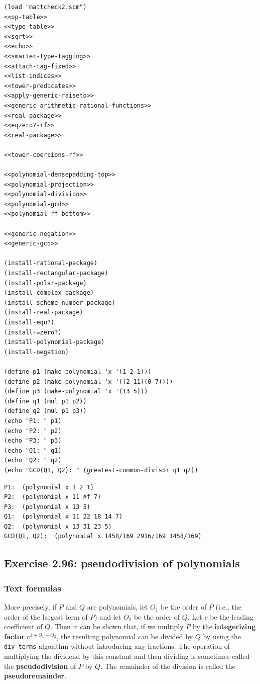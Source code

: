 \documentclass[final,fleqn,titlepage,twoside]{article}
\begin{document}
\begin{verbatim}
(load "mattcheck2.scm")
<<op-table>>
<<type-table>>
<<sqrt>>
<<echo>>
<<smarter-type-tagging>>
<<attach-tag-fixed>>
<<list-indices>>
<<tower-predicates>>
<<apply-generic-raiseto>>
<<generic-arithmetic-rational-functions>>
<<real-package>>
<<eqzero?-rf>>
<<real-package>>

<<tower-coercions-rf>>

<<polynomial-densepadding-top>>
<<polynomial-projection>>
<<polynomial-division>>
<<polynomial-gcd>>
<<polynomial-rf-bottom>>

<<generic-negation>>
<<generic-gcd>>

(install-rational-package)
(install-rectangular-package)
(install-polar-package)
(install-complex-package)
(install-scheme-number-package)
(install-real-package)
(install-equ?)
(install-=zero?)
(install-polynomial-package)
(install-negation)

(define p1 (make-polynomial 'x '(1 2 1)))
(define p2 (make-polynomial 'x '((2 11)(0 7))))
(define p3 (make-polynomial 'x '(13 5)))
(define q1 (mul p1 p2))
(define q2 (mul p1 p3))
(echo "P1: " p1)
(echo "P2: " p2)
(echo "P3: " p3)
(echo "Q1: " q1)
(echo "Q2: " q2)
(echo "GCD(Q1, Q2): " (greatest-common-divisor q1 q2))
\end{verbatim}

\begin{verbatim}
P1:  (polynomial x 1 2 1) 
P2:  (polynomial x 11 #f 7) 
P3:  (polynomial x 13 5) 
Q1:  (polynomial x 11 22 18 14 7) 
Q2:  (polynomial x 13 31 23 5) 
GCD(Q1, Q2):  (polynomial x 1458/169 2916/169 1458/169) 
\end{verbatim}

\subsection{Exercise 2.96: pseudodivision of polynomials}
\label{sec:org7c924f5}

\subsubsection{Text formulas}
\label{sec:orgb11a073}


More precisely, if \(P\) and \(Q\) are polynomials, let \(O_1\) be the order of
\(P\) (i.e., the order of the largest term of \(P\)) and let \(O_2\) be the
order of \(Q\). Let \(c\) be the leading coefficient of \(Q\). Then it can be
shown that, if we multiply \(P\) by the \textbf{integerizing factor} \(c^{1 + O_1 -
O_2}\), the resulting polynomial can be divided by \(Q\) by using the
\texttt{div-terms} algorithm without introducing any fractions. The operation
of multiplying the dividend by this constant and then dividing is sometimes
called the \textbf{pseudodivision} of \(P\) by \(Q\). The remainder of the division is
called the \textbf{pseudoremainder}.
\end{document}
